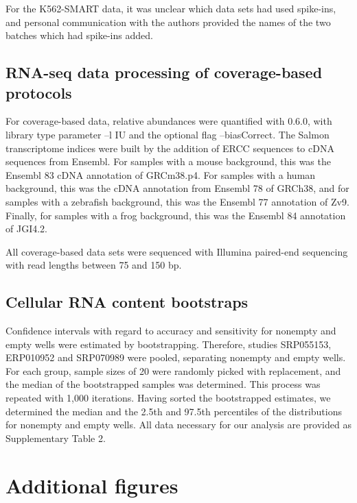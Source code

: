 For the K562-SMART data, it was unclear which data sets had used spike-ins, and personal communication with the authors provided the names of the two batches which had spike-ins added.

\subsection{RNA-seq data processing of coverage-based protocols} \label{sec:salmon}

\begin{sloppypar}
For coverage-based data, relative abundances were quantified with  \cite{Patro2017-wf} 0.6.0, with library type parameter --l IU and the optional flag --biasCorrect. The Salmon transcriptome indices were built by the addition of ERCC sequences to cDNA sequences from Ensembl. For samples with a mouse background, this was the Ensembl 83 cDNA annotation of GRCm38.p4. For samples with a human background, this was the cDNA annotation from Ensembl 78 of GRCh38, and for samples with a zebrafish background, this was the Ensembl 77 annotation of Zv9. Finally, for samples with a frog background, this was the Ensembl 84 annotation of JGI4.2.
\end{sloppypar}

All coverage-based data sets were sequenced with Illumina paired-end sequencing with read lengths between 75 and 150 bp.

\subsection{Cellular RNA content bootstraps}

Confidence intervals with regard to accuracy and sensitivity for nonempty and empty wells were estimated by bootstrapping. Therefore, studies SRP055153, ERP010952 and SRP070989 were pooled, separating nonempty and empty wells. For each group, sample sizes of 20 were randomly picked with replacement, and the median of the bootstrapped samples was determined. This process was repeated with 1,000 iterations. Having sorted the bootstrapped estimates, we determined the median and the 2.5th and 97.5th percentiles of the distributions for nonempty and empty wells. All data necessary for our analysis are provided as Supplementary Table 2.

\section{Additional figures}

